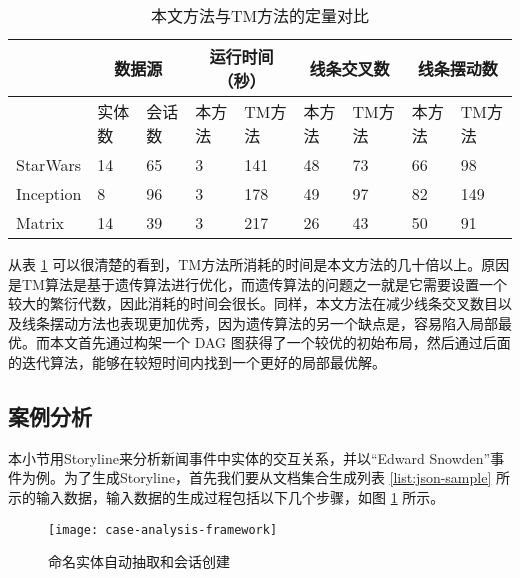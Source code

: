 \begin{table}[!htb]
\caption{本文方法与TM方法的定量对比}
\label{table:quantitative-analysis}
\begin{center}
  \begin{tabular}{|*{9}{l |}}
    \hline
              & \multicolumn{2}{c|}{数据源} & \multicolumn{2}{c|}{运行时间（秒）} & \multicolumn{2}{c|}{线条交叉数} & \multicolumn{2}{c|}{线条摆动数} \\
    \hline
              & 实体数  & 会话数  & 本方法  & TM方法  & 本方法  & TM方法  & 本方法  & TM方法 \\ \hline
    StarWars  & 14     & 65     & 3     & 141    &  48    &  73    &  66    & 98    \\ \hline
    Inception &  8     & 96     & 3     & 178    &  49    &  97    &  82    & 149   \\ \hline
    Matrix    & 14     & 39     & 3     & 217    &  26    &  43    &  50    & 91    \\ \hline
  \end{tabular}
\end{center}
\end{table}

从表 \ref{table:quantitative-analysis} 可以很清楚的看到，TM方法所消耗的时间是本文方法的几十倍以上。原因是TM算法是基于遗传算法进行优化，而遗传算法的问题之一就是它需要设置一个较大的繁衍代数，因此消耗的时间会很长。同样，本文方法在减少线条交叉数目以及线条摆动方法也表现更加优秀，因为遗传算法的另一个缺点是，容易陷入局部最优。而本文首先通过构架一个 DAG 图获得了一个较优的初始布局，然后通过后面的迭代算法，能够在较短时间内找到一个更好的局部最优解。

\subsection{案例分析}
本小节用Storyline来分析新闻事件中实体的交互关系，并以“Edward Snowden”事件为例。为了生成Storyline，首先我们要从文档集合生成列表 \ref{list:json-sample} 所示的输入数据，输入数据的生成过程包括以下几个步骤，如图 \ref{fig:case-analysis-framework} 所示。

\begin{figure}[htb]
    \centering
        \texttt{[image: case-analysis-framework]}
    \caption{命名实体自动抽取和会话创建}
    \label{fig:case-analysis-framework}
\end{figure}

